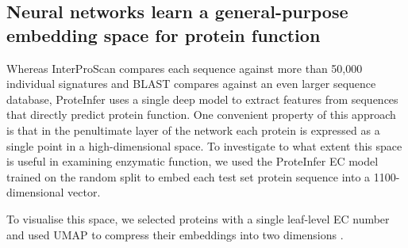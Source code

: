 \subsection*{Neural networks learn a general-purpose embedding space for protein function}
Whereas InterProScan compares each sequence against more than 50,000 %
individual signatures and BLAST compares against an even larger sequence database, ProteInfer uses a single deep model to extract features from sequences that directly predict protein function. One convenient property of this approach is that in the penultimate layer of the network each protein is expressed as a single point in a high-dimensional space. To investigate to what extent this space is useful in examining enzymatic function, we used the ProteInfer EC model trained on the random split to embed each test set protein sequence into a 1100-dimensional vector. 

To visualise this space, we selected proteins with a single leaf-level EC number and used UMAP to compress their embeddings into two dimensions \citep{umap}.

